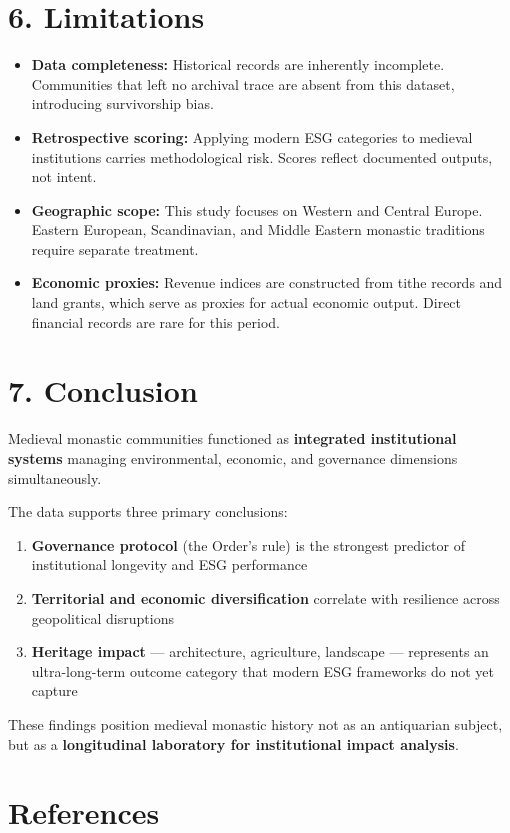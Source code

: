 \documentclass[
  11pt,
  a4paper,
]{article}
\providecommand{\tightlist}{%
  \setlength{\itemsep}{0pt}\setlength{\parskip}{0pt}}\usepackage{longtable,booktabs,array}
\begin{document}
\section{6. Limitations}\label{limitations}

\begin{itemize}
\tightlist
\item
  \textbf{Data completeness:} Historical records are inherently
  incomplete. Communities that left no archival trace are absent from
  this dataset, introducing survivorship bias.
\item
  \textbf{Retrospective scoring:} Applying modern ESG categories to
  medieval institutions carries methodological risk. Scores reflect
  documented outputs, not intent.
\item
  \textbf{Geographic scope:} This study focuses on Western and Central
  Europe. Eastern European, Scandinavian, and Middle Eastern monastic
  traditions require separate treatment.
\item
  \textbf{Economic proxies:} Revenue indices are constructed from tithe
  records and land grants, which serve as proxies for actual economic
  output. Direct financial records are rare for this period.
\end{itemize}

\section{7. Conclusion}\label{conclusion}

Medieval monastic communities functioned as \textbf{integrated
institutional systems} managing environmental, economic, and governance
dimensions simultaneously.

The data supports three primary conclusions:

\begin{enumerate}
\def\labelenumi{\arabic{enumi}.}
\tightlist
\item
  \textbf{Governance protocol} (the Order's rule) is the strongest
  predictor of institutional longevity and ESG performance
\item
  \textbf{Territorial and economic diversification} correlate with
  resilience across geopolitical disruptions
\item
  \textbf{Heritage impact} --- architecture, agriculture, landscape ---
  represents an ultra-long-term outcome category that modern ESG
  frameworks do not yet capture
\end{enumerate}

These findings position medieval monastic history not as an antiquarian
subject, but as a \textbf{longitudinal laboratory for institutional
impact analysis}.

\section{References}\label{references}
\end{document}
